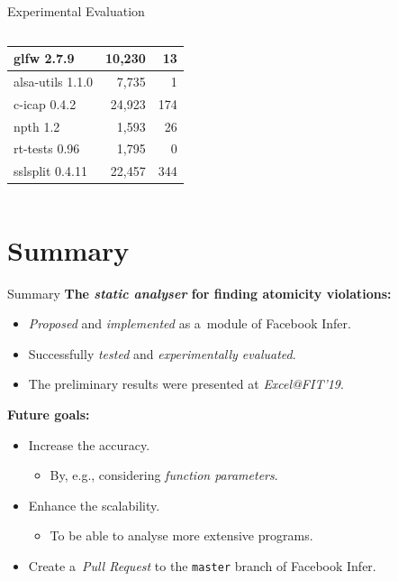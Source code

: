 \documentclass[10pt, hyperref={unicode}, aspectratio=169]{beamer}
\begin{document}
\begin{frame}{Experimental Evaluation}
\begin{columns}
\begin{column}{.5 \textwidth}
\begin{tabular}{lrr}
                glfw 2.7.9 & 10,230 & 13 \\ \hline
                alsa-utils 1.1.0 & 7,735 & 1 \\ \hline
                c-icap 0.4.2 & 24,923 & 174 \\ \hline
                npth 1.2 & 1,593 & 26 \\ \hline
                rt-tests 0.96 & 1,795 & 0 \\ \hline
                sslsplit 0.4.11 & 22,457 & 344 \\ \hline
            \end{tabular}
        \end{column}
    \end{columns}
\end{frame}


\section{Summary}
\begin{frame}{Summary}
    \textbf{The \emph{static analyser} for finding \alert{atomicity
    violations}:}
    \medskip
    \begin{itemize}\setlength\itemsep{.5em}
        \item
            \emph{Proposed} and \emph{implemented} as
            a~module of \alert{Facebook Infer}.

        \item
            Successfully \emph{tested} and \emph{experimentally
            evaluated}.

        \item
            The preliminary results were presented at \emph{Excel@FIT'19}.
    \end{itemize}

    \bigskip

    \textbf{Future goals:}
    \medskip
    \begin{itemize}\setlength\itemsep{.5em}
        \item
            Increase the \alert{accuracy}.

            \begin{itemize}
                \item
                    By, e.g., considering \emph{function parameters}.
            \end{itemize}

        \item
            Enhance the \alert{scalability}.

           \begin{itemize}
               \item
                    To be able to analyse more extensive programs.
           \end{itemize}

        \item
            Create a~\emph{Pull Request} to the \texttt{master}
            branch of Facebook Infer.
    \end{itemize}
\end{frame}
\end{document}
